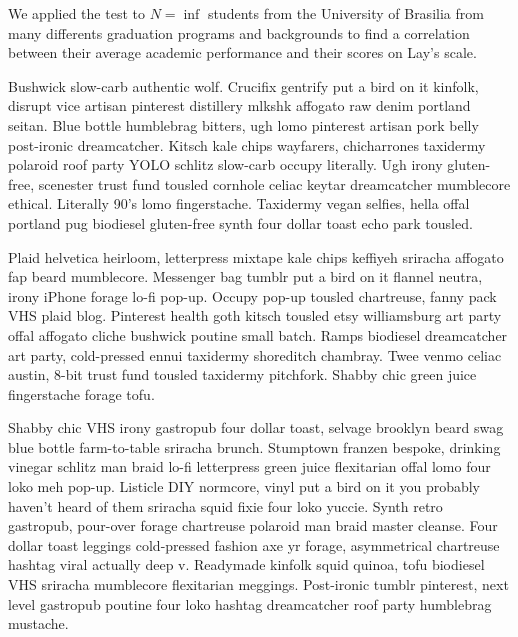 \documentclass[12pt, a4paper, twoside]{article}
\begin{document}
We applied the test to $N = \inf$ students from the University of Brasilia from many differents graduation programs and backgrounds to find a correlation between their average academic performance and their scores on Lay's scale.




Bushwick slow-carb authentic wolf. Crucifix gentrify put a bird on it kinfolk, disrupt vice artisan pinterest distillery mlkshk affogato raw denim portland seitan. Blue bottle humblebrag bitters, ugh lomo pinterest artisan pork belly post-ironic dreamcatcher. Kitsch kale chips wayfarers, chicharrones taxidermy polaroid roof party YOLO schlitz slow-carb occupy literally. Ugh irony gluten-free, scenester trust fund tousled cornhole celiac keytar dreamcatcher mumblecore ethical. Literally 90's lomo fingerstache. Taxidermy vegan selfies, hella offal portland pug biodiesel gluten-free synth four dollar toast echo park tousled.

Plaid helvetica heirloom, letterpress mixtape kale chips keffiyeh sriracha affogato fap beard mumblecore. Messenger bag tumblr put a bird on it flannel neutra, irony iPhone forage lo-fi pop-up. Occupy pop-up tousled chartreuse, fanny pack VHS plaid blog. Pinterest health goth kitsch tousled etsy williamsburg art party offal affogato cliche bushwick poutine small batch. Ramps biodiesel dreamcatcher art party, cold-pressed ennui taxidermy shoreditch chambray. Twee venmo celiac austin, 8-bit trust fund tousled taxidermy pitchfork. Shabby chic green juice fingerstache forage tofu.

Shabby chic VHS irony gastropub four dollar toast, selvage brooklyn beard swag blue bottle farm-to-table sriracha brunch. Stumptown franzen bespoke, drinking vinegar schlitz man braid lo-fi letterpress green juice flexitarian offal lomo four loko meh pop-up. Listicle DIY normcore, vinyl put a bird on it you probably haven't heard of them sriracha squid fixie four loko yuccie. Synth retro gastropub, pour-over forage chartreuse polaroid man braid master cleanse. Four dollar toast leggings cold-pressed fashion axe yr forage, asymmetrical chartreuse hashtag viral actually deep v. Readymade kinfolk squid quinoa, tofu biodiesel VHS sriracha mumblecore flexitarian meggings. Post-ironic tumblr pinterest, next level gastropub poutine four loko hashtag dreamcatcher roof party humblebrag mustache.
\end{document}
